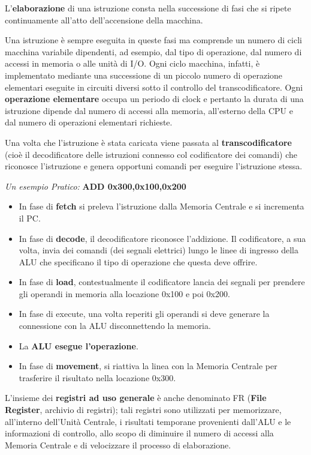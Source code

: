 \documentclass[12pt]{article}
\begin{document}
L’\textbf{elaborazione} di una istruzione consta nella successione di fasi che si ripete continuamente all’atto dell’accensione della macchina.\par\medskip\noindent
Una istruzione è sempre eseguita in queste fasi ma comprende un numero di cicli macchina variabile dipendenti, ad esempio, dal tipo di operazione, dal numero di accessi in memoria o alle unità di I/O. Ogni ciclo macchina, infatti, è implementato mediante una successione di un piccolo numero di operazione elementari eseguite in circuiti diversi sotto il controllo del transcodificatore. Ogni \textbf{operazione elementare} occupa un periodo di clock e pertanto la durata di una istruzione dipende dal numero di accessi alla memoria, all’esterno della CPU e dal numero di operazioni elementari richieste. \par\medskip\noindent
Una volta che l’istruzione è stata caricata viene passata al \textbf{transcodificatore} (cioè il decodificatore delle istruzioni connesso col codificatore dei comandi) che riconosce l’istruzione e genera opportuni comandi per eseguire l’istruzione stessa.\par\medskip\noindent
\textit{Un esempio Pratico: }\textbf{ADD 0x300,0x100,0x200}
\begin{itemize}
    \item In fase di \textbf{fetch} si preleva l’istruzione dalla Memoria Centrale e si incrementa il PC.
    \item In fase di \textbf{decode}, il decodificatore riconosce l’addizione. Il codificatore, a sua volta, invia dei comandi (dei segnali elettrici) lungo le linee di ingresso della ALU che specificano il tipo di operazione che questa deve offrire.
    \item In fase di \textbf{load}, contestualmente il codificatore lancia dei segnali per prendere gli operandi in memoria alla locazione 0x100 e poi 0x200.
    \item In fase di execute, una volta reperiti gli operandi si deve generare la connessione con la ALU disconnettendo la memoria.
    \item La \textbf{ALU esegue l’operazione}.
    \item  In fase di \textbf{movement}, si riattiva la linea con la Memoria Centrale per trasferire il risultato nella locazione 0x300.\par\medskip\noindent
\end{itemize}
L’insieme dei \textbf{registri ad uso generale} è anche denominato FR (\textbf{File Register}, archivio di registri); tali registri sono utilizzati per memorizzare, all’interno dell’Unità Centrale, i risultati temporane provenienti dall’ALU e le informazioni di controllo, allo scopo di diminuire il numero di accessi alla Memoria Centrale e di velocizzare il processo di elaborazione.\par\medskip\noindent 
\end{document}
